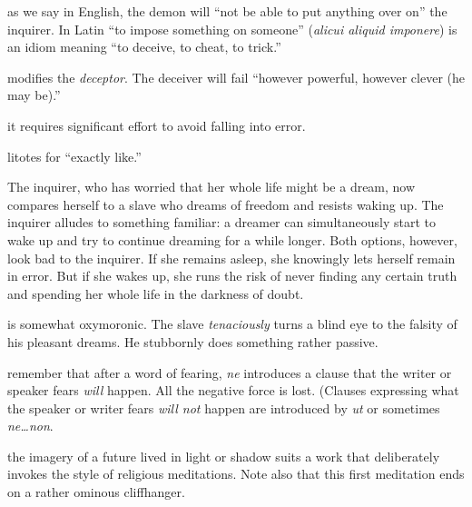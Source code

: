  as we say in English, the demon will ``not be able to put anything over on'' the inquirer. In Latin ``to impose something on someone'' (\textit{alicui aliquid imponere}) is an idiom meaning ``to deceive, to cheat, to trick.''

 modifies the \textit{deceptor}. The deceiver will fail ``however powerful, however clever (he may be).''

 it requires significant effort to avoid falling into error.

 litotes for ``exactly like.''

 The inquirer, who has worried that her whole life might be a dream, now compares herself to a slave who dreams of freedom and resists waking up. The inquirer alludes to something familiar: a dreamer can simultaneously start to wake up and try to continue dreaming for a while longer. Both options, however, look bad to the inquirer. If she remains asleep, she knowingly lets herself remain in error. But if she wakes up, she runs the risk of never finding any certain truth and spending her whole life in the darkness of doubt.

 is somewhat oxymoronic. The slave \textit{tenaciously} turns a blind eye to the falsity of his pleasant dreams. He stubbornly does something rather passive.

 remember that after a word of fearing, \textit{ne} introduces a clause that the writer or speaker fears \textit{will} happen. All the negative force is lost. (Clauses expressing what the speaker or writer fears \textit{will not} happen are introduced by \textit{ut} or sometimes \textit{ne\dots non}.

 the imagery of a future lived in light or shadow suits a work that deliberately invokes the style of religious meditations. Note also that this first meditation ends on a rather ominous cliffhanger.

